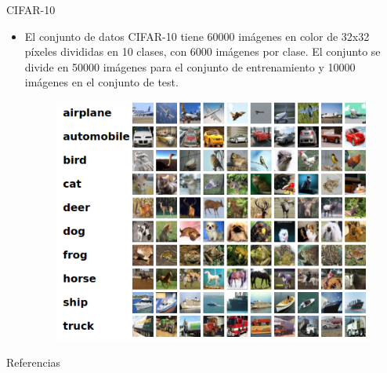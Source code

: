 \documentclass[spanish]{beamer}
\begin{document}
\begin{frame}{CIFAR-10}
\begin{itemize}
  \item El conjunto de datos CIFAR-10 tiene 60000 imágenes en color de 32x32 píxeles divididas en 10 clases, con 6000 imágenes por clase. El conjunto se divide en 50000 imágenes para el conjunto de entrenamiento y 10000 imágenes en el conjunto de test.
  \begin{figure}[h]
    \centering
    \includegraphics[width=.6\textwidth]{img/cifar10}
  \end{figure}
\end{itemize}

\end{frame}

\begin{frame}[t,allowframebreaks]{Referencias}
  \printbibliography[heading=none]
\end{frame}
\end{document}
